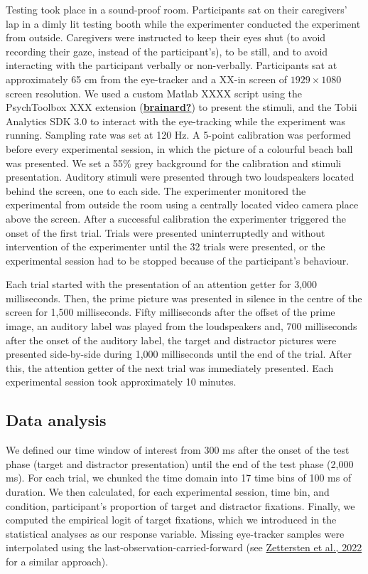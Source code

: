 \documentclass[
  letterpaper,
  DIV=11,
  numbers=noendperiod]{scrartcl}
\begin{document}
Testing took place in a sound-proof room. Participants sat on their
caregivers' lap in a dimly lit testing booth while the experimenter
conducted the experiment from outside. Caregivers were instructed to
keep their eyes shut (to avoid recording their gaze, instead of the
participant's), to be still, and to avoid interacting with the
participant verbally or non-verbally. Participants sat at approximately
65 cm from the eye-tracker and a XX-in screen of \(1929\times1080\)
screen resolution. We used a custom Matlab XXXX script using the
PsychToolbox XXX extension
(\protect\hyperlink{ref-brainard}{\textbf{brainard?}}) to present the
stimuli, and the Tobii Analytics SDK 3.0 to interact with the
eye-tracking while the experiment was running. Sampling rate was set at
120 Hz. A 5-point calibration was performed before every experimental
session, in which the picture of a colourful beach ball was presented.
We set a 55\% grey background for the calibration and stimuli
presentation. Auditory stimuli were presented through two loudspeakers
located behind the screen, one to each side. The experimenter monitored
the experimental from outside the room using a centrally located video
camera place above the screen. After a successful calibration the
experimenter triggered the onset of the first trial. Trials were
presented uninterruptedly and without intervention of the experimenter
until the 32 trials were presented, or the experimental session had to
be stopped because of the participant's behaviour.

Each trial started with the presentation of an attention getter for
3,000 milliseconds. Then, the prime picture was presented in silence in
the centre of the screen for 1,500 milliseconds. Fifty milliseconds
after the offset of the prime image, an auditory label was played from
the loudspeakers and, 700 milliseconds after the onset of the auditory
label, the target and distractor pictures were presented side-by-side
during 1,000 milliseconds until the end of the trial. After this, the
attention getter of the next trial was immediately presented. Each
experimental session took approximately 10 minutes.

\hypertarget{data-analysis}{%
\subsection{Data analysis}\label{data-analysis}}

We defined our time window of interest from 300 ms after the onset of
the test phase (target and distractor presentation) until the end of the
test phase (2,000 ms). For each trial, we chunked the time domain into
17 time bins of 100 ms of duration. We then calculated, for each
experimental session, time bin, and condition, participant's proportion
of target and distractor fixations. Finally, we computed the empirical
logit of target fixations, which we introduced in the statistical
analyses as our response variable. Missing eye-tracker samples were
interpolated using the last-observation-carried-forward (see
\protect\hyperlink{ref-zettersten2022peekbank}{Zettersten et al., 2022}
for a similar approach).
\end{document}
